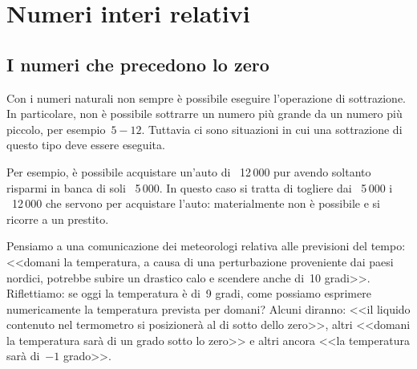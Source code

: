 


\chapter{Numeri interi relativi}


\section{I numeri che precedono lo zero}
\label{sec:int_negativi}

Con i numeri naturali non sempre è possibile eseguire l'operazione di 
sottrazione. 
In particolare, non è possibile sottrarre un numero più grande da un numero 
più piccolo, per esempio~\(5-12\). 
Tuttavia ci sono situazioni in cui una sottrazione di questo tipo deve essere 
eseguita.

Per esempio, è possibile acquistare un'auto di \officialeuro\ 12\,000 pur 
avendo soltanto risparmi in banca di soli \officialeuro\ 5\,000. 
In questo caso si tratta di togliere dai \officialeuro\ 
5\,000 i \officialeuro\ 12\,000 che servono per acquistare 
l'auto: materialmente non è possibile e si ricorre a un prestito.

Pensiamo a una comunicazione dei meteorologi relativa alle previsioni del 
tempo: <<domani la temperatura, a causa di una perturbazione proveniente dai 
paesi nordici, potrebbe subire un drastico calo e scendere anche di~10 
gradi>>. 
Riflettiamo: se oggi la temperatura è di~9 gradi, come possiamo esprimere 
numericamente la temperatura prevista per domani? 
Alcuni diranno: <<il liquido contenuto nel termometro si posizionerà al di 
sotto dello zero>>,
altri <<domani la temperatura sarà di un grado sotto lo zero>> e
altri ancora <<la temperatura sarà di~\(-1\) grado>>.

